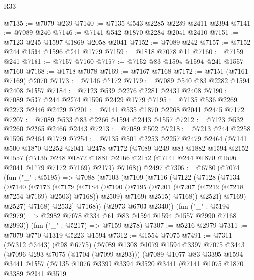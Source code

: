 \begin{lexlean}{R33}
\begin{coremodule}
@7135 := @7079 @239
@7140 := @7135 @543 @2285 @2289 @2411 @2394
@7141 := @7089 @246
@7146 := @7141 @542 @1870 @2284 @2041 @2410
@7151 := @7123 @245 @1597 @1869 @2058 @2041
@7152 := @7089 @242
@7157 := @7152 @244 @1594 @1596 @241 @1779
@7159 := @1818 @7078 @11
@7160 := @7159 @241
@7161 := @7157 @7160
@7167 := @7152 @83 @1594 @1594 @241 @1557 @7160
@7168 := @1718 @7078
@7169 := @7167 @7168
@7172 := @7151 (@7161 @7169) @2070
@7173 := @7146 @7172
@7179 := @7089 @540 @83 @2282 @1594 @2408 @1557
@7184 := @7123 @539 @2276 @2281 @2431 @2408
@7190 := @7089 @537 @244 @2274 @1596 @2429 @1779
@7195 := @7135 @536 @2269 @2273 @2446 @2429
@7201 := @7141 @535 @1870 @2268 @2041 @2445 @7172
@7207 := @7089 @533 @83 @2266 @1594 @2443 @1557
@7212 := @7123 @532 @2260 @2265 @2466 @2443
@7213 := @7089 @502
@7218 := @7213 @244 @2258 @1596 @2464 @1779
@7254 := @7135
    @501
    @2253
    @2257
    @2479
    @2464
    (@7141
      @500
      @1870
      @2252
      @2041
      @2478
      @7172
      (@7089
        @249
        @83
        @1882
        @1594
        @2152
        @1557
        (@7135 @248 @1872 @1881 @2166 @2152 (@7141 @244 @1870 @1596 @2041 @1779 @7172 @7169) @2179)
        @7168))
    @2497
@7306 := @6780
    (@7074
      (fun ("_" : @5195) =>
      @7088
        (@7103
          (@7109
            (@7116
              (@7122
                (@7128
                  (@7134
                    (@7140
                      (@7173
                        (@7179
                          (@7184
                            (@7190
                              (@7195 (@7201 (@7207 (@7212 (@7218 @7254 @7169) @2503) @7168)) @2509)
                              @7169)
                            @2515)
                          @7168))
                      @2521)
                    @7169)
                  @2527)
                @7168)
              @2532)
            @7168))
        (@2973 @6703 @2340))
      (fun ("_" : @5194 @2979) => @2982 @7078 @334 @61 @83 @1594 @1594 @1557 @2990 @7168 @2993))
    (fun ("_" : @5217) => @7159 @278)
@7307 := @5216 @2979
@7311 := @7079 @770 @1319 @5223 @1594
@7312 := @1554 @7075
@7491 := @7311
    (@7312 @3443)
    (@98 @6775)
    (@7089
      @1308
      @1079
      @1594
      @3397
      @7075
      @3443
      (@7096 @293 @7075 (@1704 (@7099 @293)))
      (@7089
        @1077
        @83
        @3395
        @1594
        @3441
        @1557
        (@7135
          @1076
          @3390
          @3394
          @3520
          @3441
          (@7141
            @1075
            @1870
            @3389
            @2041
            @3519

\end{coremodule}
\end{lexlean}
